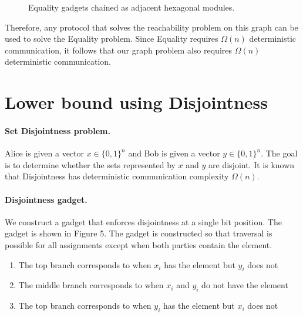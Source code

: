 \documentclass{article}
\begin{document}
\begin{figure}[h]
\centering
{}

\caption{Equality gadgets chained as adjacent hexagonal modules.}
\end{figure}

Therefore, any protocol that solves the reachability problem on this graph can be used to solve the Equality problem. Since Equality requires $\Omega(n)$ deterministic communication, it follows that our graph problem also requires $\Omega(n)$ deterministic communication.

\newpage

\section*{Lower bound using Disjointness}

\paragraph{Set Disjointness problem.}
Alice is given a vector 
$x \in \{0,1\}^n$ and Bob is given a vector $y \in \{0,1\}^n$. 
The goal is to determine whether the sets represented by $x$ and $y$ are disjoint. It is known that Disjointness has deterministic communication complexity $\Omega(n)$.

\paragraph{Disjointness gadget.}
We construct a gadget that enforces disjointness at a single bit position. The gadget is shown in Figure 5. The gadget is constructed so that traversal is possible for all assignments except when both parties contain the element.

\begin{enumerate}
    \item The top branch corresponds to when $x_i$ has the element but $y_i$ does not
    \item The middle branch corresponds to when $x_i$ and $y_i$ do not have the element
    \item The top branch corresponds to when $y_i$ has the element but $x_i$ does not
\end{enumerate}
\end{document}

